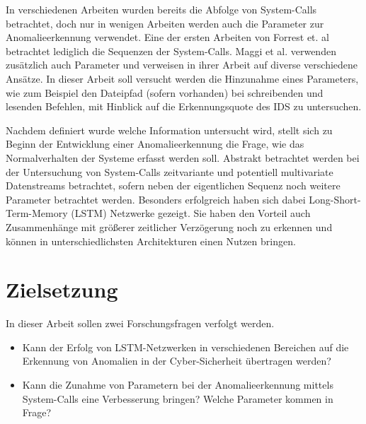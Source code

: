 In verschiedenen Arbeiten wurden bereits die Abfolge von System-Calls betrachtet, doch nur in wenigen Arbeiten werden auch die Parameter zur Anomalieerkennung verwendet. Eine der ersten Arbeiten von Forrest et. al \cite{FORREST} betrachtet lediglich die Sequenzen der System-Calls. Maggi et al. verwenden zusätzlich auch Parameter und verweisen in ihrer Arbeit \cite{MAGGI} auf diverse verschiedene Ansätze.
In dieser Arbeit soll versucht werden die Hinzunahme eines Parameters, wie zum Beispiel den Dateipfad (sofern vorhanden) bei schreibenden und lesenden Befehlen, mit Hinblick auf die Erkennungsquote des IDS zu untersuchen.

Nachdem definiert wurde welche Information untersucht wird, stellt sich zu Beginn der Entwicklung einer Anomalieerkennung die Frage, wie das Normalverhalten der Systeme erfasst werden soll.
Abstrakt betrachtet werden bei der Untersuchung von System-Calls zeitvariante und potentiell multivariate Datenstreams betrachtet, sofern neben der eigentlichen Sequenz noch weitere Parameter betrachtet werden.
Besonders erfolgreich haben sich dabei Long-Short-Term-Memory (LSTM) Netzwerke gezeigt.
Sie haben den Vorteil auch Zusammenhänge mit größerer zeitlicher Verzögerung noch zu erkennen \cite{HOCHREITER} und können in unterschiedlichsten Architekturen einen Nutzen bringen. %

\section{Zielsetzung}

In dieser Arbeit sollen zwei Forschungsfragen verfolgt werden.
\begin{itemize}
    \item Kann der Erfolg von LSTM-Netzwerken in verschiedenen Bereichen auf die Erkennung von Anomalien in der Cyber-Sicherheit übertragen werden?
    \item Kann die Zunahme von Parametern bei der Anomalieerkennung mittels System-Calls eine Verbesserung bringen?
        \subitem Welche Parameter kommen in Frage?
\end{itemize}

